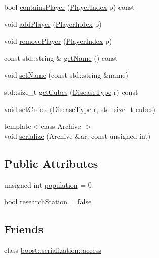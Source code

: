 \begin{DoxyCompactItemize}
\item 
bool \hyperlink{classpan_1_1_city_af548c54d6e134c72c6bb9b2ab895f7d5}{contains\+Player} (\hyperlink{namespacepan_a0cdabf874fbf1bb3a1f0152d108c2909}{Player\+Index} p) const
\item 
void \hyperlink{classpan_1_1_city_aef9a86d5ddb998226127e21df91a7589}{add\+Player} (\hyperlink{namespacepan_a0cdabf874fbf1bb3a1f0152d108c2909}{Player\+Index} p)
\item 
void \hyperlink{classpan_1_1_city_aa3ed9dcde255c83466431f6b55031e9d}{remove\+Player} (\hyperlink{namespacepan_a0cdabf874fbf1bb3a1f0152d108c2909}{Player\+Index} p)
\item 
const std\+::string \& \hyperlink{classpan_1_1_city_a5b6f8e81d190dcddd6d78445cba7f694}{get\+Name} () const
\item 
void \hyperlink{classpan_1_1_city_a9a25b8843ae24c9bbe36a818aa29a9d5}{set\+Name} (const std\+::string \&name)
\item 
std\+::size\+\_\+t \hyperlink{classpan_1_1_city_ae6c690c21186c5531eb5fc7a314e8e2d}{get\+Cubes} (\hyperlink{namespacepan_a48851b51b0aef3f0e1be80df5031d9d7}{Disease\+Type} r) const
\item 
void \hyperlink{classpan_1_1_city_abd77b16cbb277ff3dd9699e4e79ed1d5}{set\+Cubes} (\hyperlink{namespacepan_a48851b51b0aef3f0e1be80df5031d9d7}{Disease\+Type} r, std\+::size\+\_\+t cubes)
\item 
{\footnotesize template$<$class Archive $>$ }\\void \hyperlink{classpan_1_1_city_a712b0f8a3f35f7caf3f3b8795a89658b}{serialize} (Archive \&ar, const unsigned int)
\end{DoxyCompactItemize}
\subsection*{Public Attributes}
\begin{DoxyCompactItemize}
\item 
unsigned int \hyperlink{classpan_1_1_city_aedd352c6f6ecaf1c78184189cef035b7}{population} = 0
\item 
bool \hyperlink{classpan_1_1_city_ae278568277b94033909dbf31ad8843ff}{research\+Station} = false
\end{DoxyCompactItemize}
\subsection*{Friends}
\begin{DoxyCompactItemize}
\item 
class \hyperlink{classpan_1_1_city_ac98d07dd8f7b70e16ccb9a01abf56b9c}{boost\+::serialization\+::access}
\end{DoxyCompactItemize}


